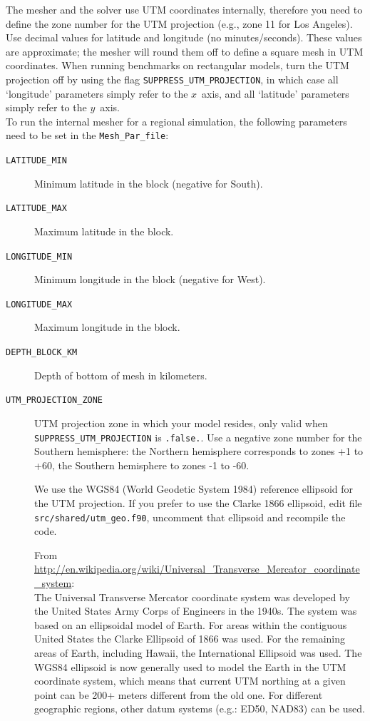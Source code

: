 The mesher and the solver use UTM coordinates internally, therefore
you need to define the zone number for the UTM projection (e.g., zone
11 for Los Angeles). Use decimal values for latitude and longitude
(no minutes/seconds). These values are approximate; the mesher will
round them off to define a square mesh in UTM coordinates. When running
benchmarks on rectangular models, turn the UTM projection off by using
the flag \texttt{\small SUPPRESS\_UTM\_PROJECTION},
in which case all `longitude' parameters simply refer to the $x$~axis, and
all `latitude' parameters simply refer to the $y$~axis.\\


\noindent
To run the
internal mesher for a regional simulation, the following parameters need to be
set in the \texttt{\small Mesh\_Par\_file}:
%
\begin{description}
\item [{\texttt{LATITUDE\_MIN}}] Minimum latitude in the block (negative
for South).
\item [{\texttt{LATITUDE\_MAX}}] Maximum latitude in the block.
\item [{\texttt{LONGITUDE\_MIN}}] Minimum longitude in the block (negative
for West).
\item [{\texttt{LONGITUDE\_MAX}}] Maximum longitude in the block.
\item [{\texttt{DEPTH\_BLOCK\_KM}}] Depth of bottom of mesh in kilometers.
\item [{\texttt{UTM\_PROJECTION\_ZONE}}] UTM projection zone in
which your model resides, only valid when
\texttt{SUPPRESS\_UTM\_PROJECTION} is \texttt{.false.}.
Use a negative zone number for the Southern hemisphere:
the Northern hemisphere corresponds to zones +1 to +60,
the Southern hemisphere to zones -1 to -60.


We use the WGS84 (World Geodetic System 1984) reference ellipsoid for the UTM projection. If you prefer to use the Clarke 1866 ellipsoid,
edit file \texttt{src/shared/utm\_geo.f90}, uncomment that ellipsoid and recompile the code.

From \url{http://en.wikipedia.org/wiki/Universal_Transverse_Mercator_coordinate_system}:\\
The Universal Transverse Mercator coordinate system was developed by the United States Army Corps of Engineers in the 1940s.
The system was based on an ellipsoidal model of Earth. For areas within the contiguous United States
the Clarke Ellipsoid of 1866 was used. For the remaining areas of Earth, including Hawaii, the International Ellipsoid was used.
The WGS84 ellipsoid is now generally used to model the Earth in the UTM coordinate system,
which means that current UTM northing at a given point can be 200+ meters different from the old one.
For different geographic regions, other datum systems (e.g.: ED50, NAD83) can be used.


\end{description}
